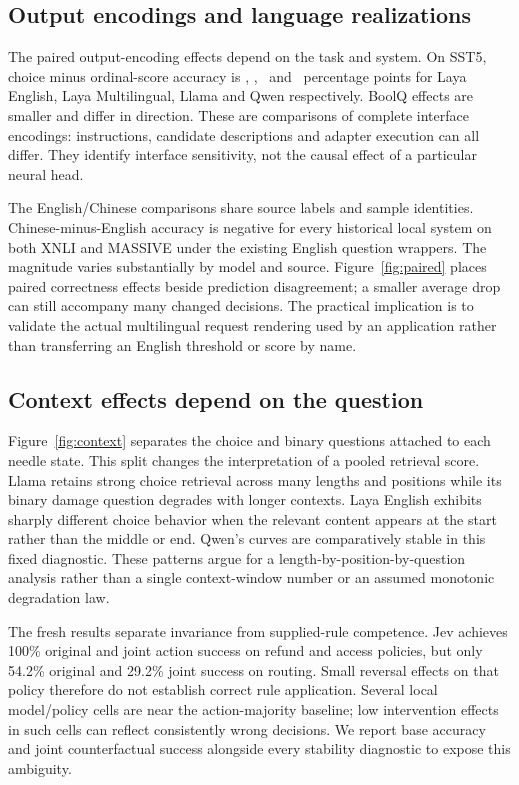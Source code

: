 \subsection{Output encodings and language realizations}
The paired output-encoding effects depend on the task and system. On SST5, choice minus ordinal-score accuracy is \SSTEN, \SSTMulti, \SSTLlama\ and \SSTQwen\ percentage points for Laya English, Laya Multilingual, Llama and Qwen respectively. BoolQ effects are smaller and differ in direction. These are comparisons of complete interface encodings: instructions, candidate descriptions and adapter execution can all differ. They identify interface sensitivity, not the causal effect of a particular neural head.

The English/Chinese comparisons share source labels and sample identities. Chinese-minus-English accuracy is negative for every historical local system on both XNLI and MASSIVE under the existing English question wrappers. The magnitude varies substantially by model and source. Figure~\ref{fig:paired} places paired correctness effects beside prediction disagreement; a smaller average drop can still accompany many changed decisions. The practical implication is to validate the actual multilingual request rendering used by an application rather than transferring an English threshold or score by name.

\subsection{Context effects depend on the question}
Figure~\ref{fig:context} separates the choice and binary questions attached to each needle state. This split changes the interpretation of a pooled retrieval score. Llama retains strong choice retrieval across many lengths and positions while its binary damage question degrades with longer contexts. Laya English exhibits sharply different choice behavior when the relevant content appears at the start rather than the middle or end. Qwen's curves are comparatively stable in this fixed diagnostic. These patterns argue for a length-by-position-by-question analysis rather than a single context-window number or an assumed monotonic degradation law.



The fresh results separate invariance from supplied-rule competence. Jev achieves 100\% original and joint action success on refund and access policies, but only 54.2\% original and 29.2\% joint success on routing. Small reversal effects on that policy therefore do not establish correct rule application. Several local model/policy cells are near the action-majority baseline; low intervention effects in such cells can reflect consistently wrong decisions. We report base accuracy and joint counterfactual success alongside every stability diagnostic to expose this ambiguity.

